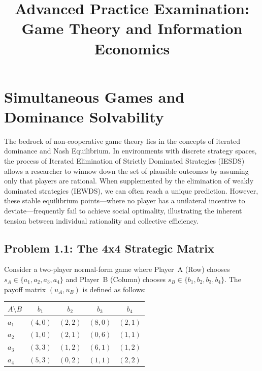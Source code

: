 \documentclass[12pt,a4paper]{article}
\title{\textbf{Advanced Practice Examination:}\\
       \Large Game Theory and Information Economics}
\author{ }
\date{ }
\begin{document}
\maketitle

\section{Simultaneous Games and Dominance Solvability}

The bedrock of non-cooperative game theory lies in the concepts of iterated dominance and Nash Equilibrium. In environments with discrete strategy spaces, the process of Iterated Elimination of Strictly Dominated Strategies (IESDS) allows a researcher to winnow down the set of plausible outcomes by assuming only that players are rational. When supplemented by the elimination of weakly dominated strategies (IEWDS), we can often reach a unique prediction. However, these stable equilibrium points---where no player has a unilateral incentive to deviate---frequently fail to achieve social optimality, illustrating the inherent tension between individual rationality and collective efficiency.

\subsection*{Problem 1.1: The 4x4 Strategic Matrix}

Consider a two-player normal-form game where Player~A (Row) chooses
\(
  s_A \in \{a_1, a_2, a_3, a_4\}
\)
and Player~B (Column) chooses
\(
  s_B \in \{b_1, b_2, b_3, b_4\}
\).
The payoff matrix \((u_A, u_B)\) is defined as follows:

\begin{table}[h!]
  \centering
  \renewcommand{\arraystretch}{1.1}
  \begin{tabular}{lcccc}
    \toprule
    $A \setminus B$ & $b_1$ & $b_2$ & $b_3$ & $b_4$ \\
    \midrule
    $a_1$ & $(4,0)$ & $(2,2)$ & $(8,0)$ & $(2,1)$ \\
    $a_2$ & $(1,0)$ & $(2,1)$ & $(0,6)$ & $(1,1)$ \\
    $a_3$ & $(3,3)$ & $(1,2)$ & $(6,1)$ & $(1,2)$ \\
    $a_4$ & $(5,3)$ & $(0,2)$ & $(1,1)$ & $(2,2)$ \\
    \bottomrule
  \end{tabular}
\end{table}
\end{document}
